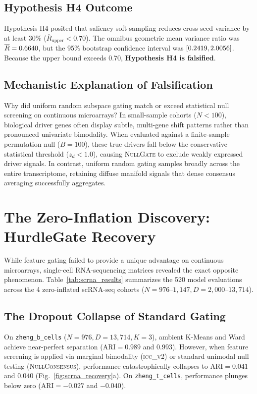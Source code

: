\documentclass[preprint,12pt]{elsarticle}
\begin{document}
\subsection{Hypothesis H4 Outcome}
Hypothesis H4 posited that saliency soft-sampling reduces cross-seed variance by at least 30\% ($\overline{R}_{\text{upper}} < 0.70$). The omnibus geometric mean variance ratio was $\overline{R} = 0.6640$, but the 95\% bootstrap confidence interval was $[0.2419, 2.0056]$. Because the upper bound exceeds 0.70, \textbf{Hypothesis H4 is falsified}.

\subsection{Mechanistic Explanation of Falsification}
Why did uniform random subspace gating match or exceed statistical null screening on continuous microarrays? 
In small-sample cohorts ($N < 100$), biological driver genes often display subtle, multi-gene shift patterns rather than pronounced univariate bimodality. When evaluated against a finite-sample permutation null ($B = 100$), these true drivers fall below the conservative statistical threshold ($z_d < 1.0$), causing \textsc{NullGate} to exclude weakly expressed driver signals. In contrast, uniform random gating samples broadly across the entire transcriptome, retaining diffuse manifold signals that dense consensus averaging successfully aggregates.



\section{The Zero-Inflation Discovery: HurdleGate Recovery}\label{sec:scrna_recovery}

While feature gating failed to provide a unique advantage on continuous microarrays, single-cell RNA-sequencing matrices revealed the exact opposite phenomenon. Table~\ref{tab:scrna_results} summarizes the 520 model evaluations across the 4 zero-inflated scRNA-seq cohorts ($N=976\text{--}1{,}147, D=2{,}000\text{--}13{,}714$).

\subsection{The Dropout Collapse of Standard Gating}
On \texttt{zheng\_b\_cells} ($N=976, D=13{,}714, K=3$), ambient K-Means and Ward achieve near-perfect separation ($\text{ARI} = 0.989$ and $0.993$). However, when feature screening is applied via marginal bimodality (\textsc{icc\_v2}) or standard unimodal null testing (\textsc{NullConsensus}), performance catastrophically collapses to $\text{ARI} = 0.041$ and $0.040$ (Fig.~\ref{fig:scrna_recovery}a). On \texttt{zheng\_t\_cells}, performance plunges below zero ($\text{ARI} = -0.027$ and $-0.040$).
\end{document}
